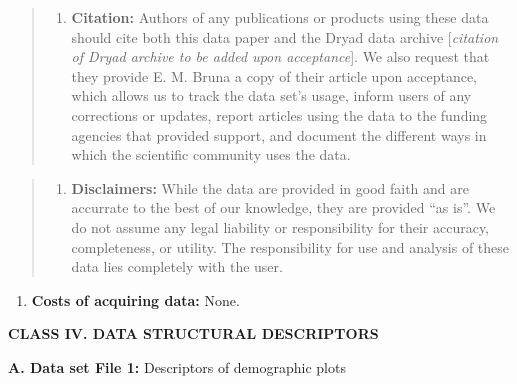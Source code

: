 \documentclass[
  man, donotrepeattitle,floatsintext]{apa6}
\providecommand{\tightlist}{%
  \setlength{\itemsep}{0pt}\setlength{\parskip}{0pt}}
\begin{document}
\begin{quote}
\begin{enumerate}
\def\labelenumi{\alph{enumi}.}
\setcounter{enumi}{1}
\tightlist
\item
  \textbf{Citation:} Authors of any publications or products using these data should cite both this data paper and the Dryad data archive {[}\emph{citation of Dryad archive to be added upon acceptance}{]}. We also request that they provide E. M. Bruna a copy of their article upon acceptance, which allows us to track the data set's usage, inform users of any corrections or updates, report articles using the data to the funding agencies that provided support, and document the different ways in which the scientific community uses the data.
\end{enumerate}
\end{quote}

\begin{quote}
\begin{enumerate}
\def\labelenumi{\alph{enumi}.}
\setcounter{enumi}{2}
\tightlist
\item
  \textbf{Disclaimers:} While the data are provided in good faith and are accurrate to the best of our knowledge, they are provided ``as is''. We do not assume any legal liability or responsibility for their accuracy, completeness, or utility. The responsibility for use and analysis of these data lies completely with the user.
\end{enumerate}
\end{quote}

\begin{enumerate}
\def\labelenumi{\arabic{enumi}.}
\setcounter{enumi}{4}
\tightlist
\item
  \textbf{Costs of acquiring data:} None.
\end{enumerate}

\noindent  
\textbf{CLASS IV. DATA STRUCTURAL DESCRIPTORS}

\noindent  
\textbf{A. Data set File 1:} Descriptors of demographic plots
\end{document}
